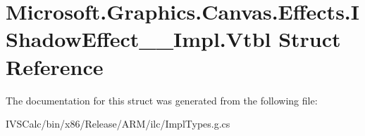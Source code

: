 \hypertarget{struct_microsoft_1_1_graphics_1_1_canvas_1_1_effects_1_1_i_shadow_effect_____impl_1_1_vtbl}{}\section{Microsoft.\+Graphics.\+Canvas.\+Effects.\+I\+Shadow\+Effect\+\_\+\+\_\+\+Impl.\+Vtbl Struct Reference}
\label{struct_microsoft_1_1_graphics_1_1_canvas_1_1_effects_1_1_i_shadow_effect_____impl_1_1_vtbl}


The documentation for this struct was generated from the following file\+:\begin{DoxyCompactItemize}
\item 
I\+V\+S\+Calc/bin/x86/\+Release/\+A\+R\+M/ilc/Impl\+Types.\+g.\+cs\end{DoxyCompactItemize}
